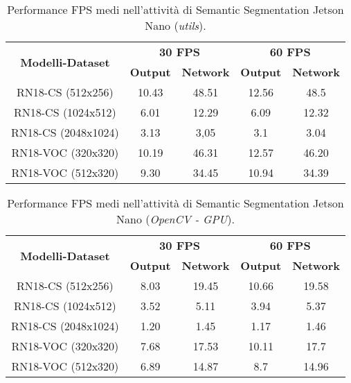 \begin{table}
    \renewcommand{\baselinestretch}{1}
    \centering
    \begin{adjustbox}{max width=\textwidth}
    \begin{tabular}{|c||c|c||c|c||}
        \hline
        \multirow{2}{*}{\bfseries{\Large Modelli-Dataset}} & \multicolumn{2}{c||}{\bfseries{30 FPS}} & \multicolumn{2}{c||}{\bfseries{60 FPS}}\\            & \bfseries{Output} & \bfseries{Network} & \bfseries{Output} & \bfseries{Network}\\
        \hline
        \hline
        RN18-CS (512x256) & 10.43 & 48.51 & 12.56 & 48.5\\
        \hline
        RN18-CS (1024x512) & 6.01 & 12.29 & 6.09 & 12.32\\
        \hline 
        RN18-CS (2048x1024) & 3.13 & 3,05 & 3.1 & 3.04\\
        \hline
        RN18-VOC (320x320) & 10.19 &  46.31 & 12.57 & 46.20\\
        \hline
        RN18-VOC (512x320) & 9.30 & 34.45 & 10.94 & 34.39\\
        \hline
    \end{tabular}
    \end{adjustbox}
    \vspace{0.5cm}
    \caption{Performance FPS medi nell'attività di Semantic Segmentation Jetson Nano (\emph{utils}).}
    \label{average performance jetson utils sem_seg}
\end{table}

\begin{table}
    \renewcommand{\baselinestretch}{1}
    \centering
    \begin{adjustbox}{max width=\textwidth}
    \begin{tabular}{|c||c|c||c|c||}
        \hline
        \multirow{2}{*}{\bfseries{\Large Modelli-Dataset}} & \multicolumn{2}{c||}{\bfseries{30 FPS}} & \multicolumn{2}{c||}{\bfseries{60 FPS}}\\            & \bfseries{Output} & \bfseries{Network} & \bfseries{Output} & \bfseries{Network}\\
        \hline
        \hline
        RN18-CS (512x256) & 8.03 & 19.45 & 10.66 & 19.58\\
        \hline
        RN18-CS (1024x512) & 3.52 & 5.11 & 3.94 & 5.37\\
        \hline 
        RN18-CS (2048x1024) & 1.20 & 1.45 & 1.17 & 1.46\\
        \hline
        RN18-VOC (320x320) & 7.68 &  17.53 & 10.11 & 17.7\\
        \hline
        RN18-VOC (512x320) & 6.89 & 14.87 & 8.7 & 14.96\\
        \hline
    \end{tabular}
    \end{adjustbox}
    \vspace{0.5cm}
    \caption{Performance FPS medi nell'attività di Semantic Segmentation Jetson Nano (\emph{OpenCV - GPU}).}
    \label{average performance jetson opencv GPU sem_seg}
\end{table}

